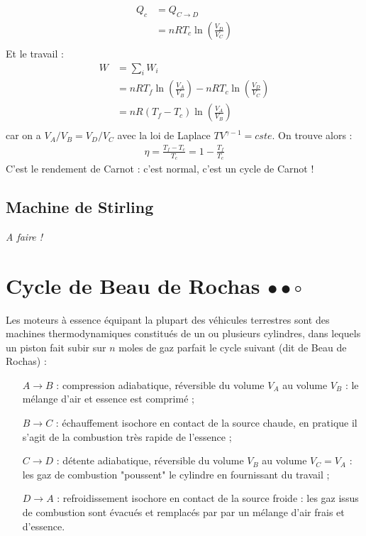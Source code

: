 \documentclass{report}
\begin{document}
\begin{itemize}
\begin{align*}
	Q_c&=Q_{C\rightarrow D}\\
	&=nRT_c\ln\left(\frac{V_D}{V_C} \right)\\
\end{align*}		
Et le travail :	
\begin{align*}
	W&=\sum_i W_i\\
	&=nRT_f\ln\left(\frac{V_A}{V_B} \right)-nRT_c\ln\left(\frac{V_D}{V_C} \right)\\
	&=nR(T_f - T_c)\ln\left(\frac{V_A}{V_B} \right)\\
\end{align*}		
car on a $V_A/V_B=V_D/V_C$ avec la loi de Laplace $TV^{\gamma-1}=cste$.
On trouve alors :
\begin{align*}
	\eta=\frac{T_f-T_c}{T_c}=1-\frac{T_f}{T_c}
\end{align*}
C'est le rendement de Carnot : c'est normal, c'est un cycle de Carnot !

\subsection*{Machine de Stirling}

\textit{A faire !}

\end{itemize}

\newpage

\section*{Cycle de Beau de Rochas $\bullet\bullet\circ$}

Les moteurs à essence équipant la plupart des véhicules terrestres sont des machines thermodynamiques constitués de un ou plusieurs cylindres, dans lequels un piston fait subir sur $n$ moles de gaz parfait le cycle suivant (dit de Beau de Rochas) :

\begin{itemize}

\item[$A \rightarrow B$ :] compression adiabatique, réversible du volume $V_A$ au volume $V_B$ : le mélange d'air et essence est comprimé ;
\item[$B \rightarrow C$ :] échauffement isochore en contact de la source chaude, en pratique il s'agit de la combustion très rapide de l'essence ;
\item[$C \rightarrow D$ :] détente adiabatique, réversible du volume $V_B$ au volume $V_C=V_A$ : les gaz de combustion "poussent" le cylindre en fournissant du travail ;
\item[$D \rightarrow A$ :] refroidissement isochore en contact de la source froide : les gaz issus de combustion sont évacués et remplacés par par un mélange d'air frais et d'essence.

\end{itemize}
\end{document}

